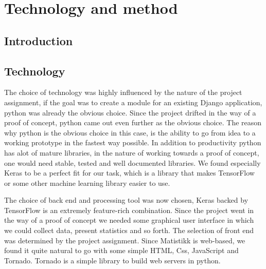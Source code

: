 \chapter{Technology and method}

% 

\section{Introduction}



\section{Technology}
The choice of technology was highly influenced by the nature of the project assignment, if the goal was to create a module for an existing Django application, python was already the obvious choice. Since the project drifted in the way of a proof of concept, python came out even further as the obvious choice. The reason why python is the obvious choice in this case, is the ability to go from idea to a working prototype in the fastest way possible. In addition to productivity python has alot of mature libraries, in the nature of working towards a proof of concept, one would need stable, tested and well documented libraries. We found especially Keras \parencite{chollet_keras_2015} to be a perfect fit for our task, which is a library that makes TensorFlow or some other machine learning library easier to use.\\
\quad

The choice of back end and processing tool was now chosen, Keras backed by TensorFlow is an extremely feature-rich combination. Since the project went in the way of a proof of concept we needed some graphical user interface in which we could collect data, present statistics and so forth. The selection of front end was determined by the project assignment. Since Matistikk is web-based, we found it quite natural to go with some simple HTML, Css, JavaScript and Tornado. Tornado is a simple library to build web servers in python.

